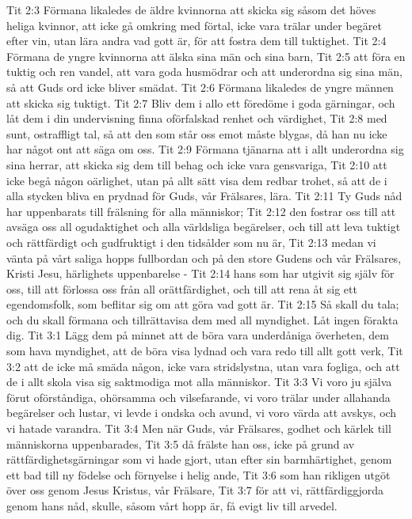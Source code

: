 Tit 2:3  Förmana likaledes de äldre kvinnorna att skicka sig såsom det höves heliga kvinnor, att icke gå omkring med förtal, icke vara trälar under begäret efter vin, utan lära andra vad gott är, för att fostra dem till tuktighet.
Tit 2:4  Förmana de yngre kvinnorna att älska sina män och sina barn,
Tit 2:5  att föra en tuktig och ren vandel, att vara goda husmödrar och att underordna sig sina män, så att Guds ord icke bliver smädat.
Tit 2:6  Förmana likaledes de yngre männen att skicka sig tuktigt.
Tit 2:7  Bliv dem i allo ett föredöme i goda gärningar, och låt dem i din undervisning finna oförfalskad renhet och värdighet,
Tit 2:8  med sunt, ostraffligt tal, så att den som står oss emot måste blygas, då han nu icke har något ont att säga om oss.
Tit 2:9  Förmana tjänarna att i allt underordna sig sina herrar, att skicka sig dem till behag och icke vara gensvariga,
Tit 2:10  att icke begå någon oärlighet, utan på allt sätt visa dem redbar trohet, så att de i alla stycken bliva en prydnad för Guds, vår Frälsares, lära.
Tit 2:11  Ty Guds nåd har uppenbarats till frälsning för alla människor;
Tit 2:12  den fostrar oss till att avsäga oss all ogudaktighet och alla världsliga begärelser, och till att leva tuktigt och rättfärdigt och gudfruktigt i den tidsålder som nu är,
Tit 2:13  medan vi vänta på vårt saliga hopps fullbordan och på den store Gudens och vår Frälsares, Kristi Jesu, härlighets uppenbarelse -
Tit 2:14  hans som har utgivit sig själv för oss, till att förlossa oss från all orättfärdighet, och till att rena åt sig ett egendomsfolk, som beflitar sig om att göra vad gott är.
Tit 2:15  Så skall du tala; och du skall förmana och tillrättavisa dem med all myndighet. Låt ingen förakta dig.
Tit 3:1  Lägg dem på minnet att de böra vara underdåniga överheten, dem som hava myndighet, att de böra visa lydnad och vara redo till allt gott verk,
Tit 3:2  att de icke må smäda någon, icke vara stridslystna, utan vara fogliga, och att de i allt skola visa sig saktmodiga mot alla människor.
Tit 3:3  Vi voro ju själva förut oförståndiga, ohörsamma och vilsefarande, vi voro trälar under allahanda begärelser och lustar, vi levde i ondska och avund, vi voro värda att avskys, och vi hatade varandra.
Tit 3:4  Men när Guds, vår Frälsares, godhet och kärlek till människorna uppenbarades,
Tit 3:5  då frälste han oss, icke på grund av rättfärdighetsgärningar som vi hade gjort, utan efter sin barmhärtighet, genom ett bad till ny födelse och förnyelse i helig ande,
Tit 3:6  som han rikligen utgöt över oss genom Jesus Kristus, vår Frälsare,
Tit 3:7  för att vi, rättfärdiggjorda genom hans nåd, skulle, såsom vårt hopp är, få evigt liv till arvedel.
